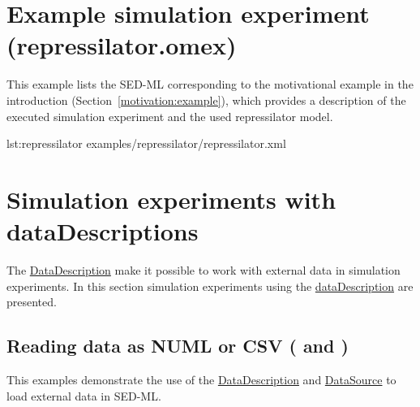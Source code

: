 \section{Example simulation experiment (repressilator.omex)}
\label{example:repressilator}
This example lists the SED-ML corresponding to the motivational example in the introduction (Section~\ref{motivation:example}), which provides a description of the executed simulation experiment and the used repressilator model. 

{lst:repressilator}
{examples/repressilator/repressilator.xml}


\section{Simulation experiments with dataDescriptions}
The \hyperref[class:dataDescription]{DataDescription} make it possible to work with external data in simulation experiments. In this section simulation experiments using the \hyperref[class:dataDescription]{dataDescription} are presented.

\subsection{Reading data as NUML or CSV ( and )}
This examples demonstrate the use of the \hyperref[class:dataDescription]{DataDescription} and \hyperref[class:dataSource]{DataSource} to load external data in SED-ML. 

